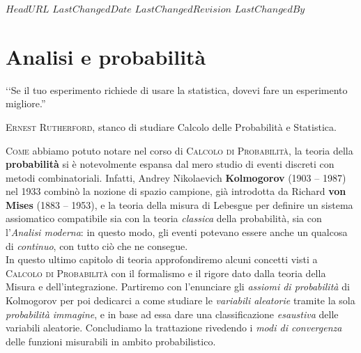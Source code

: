 \svnidlong
{$HeadURL$}
{$LastChangedDate$}
{$LastChangedRevision$}
{$LastChangedBy$}

\chapter{Analisi e probabilità}

\begin{introduction}
	‘‘Se il tuo esperimento richiede di usare la statistica, dovevi fare un esperimento migliore.''
	\begin{flushright}
		\textsc{Ernest Rutherford,} stanco di studiare Calcolo delle Probabilità e Statistica.
	\end{flushright}
\end{introduction}
\lettrine[findent=1pt, nindent=0pt]{C}{ome} abbiamo potuto notare nel corso di \textsc{Calcolo di Probabilità}, la teoria della \textbf{probabilità} si è notevolmente espansa dal mero studio di eventi discreti con metodi combinatoriali. Infatti, Andrey Nikolaevich \textbf{Kolmogorov} (1903 – 1987) nel 1933 combinò la nozione di spazio campione, già introdotta da Richard \textbf{von Mises} (1883 – 1953), e la teoria della misura di Lebesgue per definire un sistema assiomatico compatibile sia con la teoria \textit{classica} della probabilità, sia con l'\textit{Analisi moderna}: in questo modo, gli eventi potevano essere anche un qualcosa di \textit{continuo}, con tutto ciò che ne consegue.\\
In questo ultimo capitolo di teoria approfondiremo alcuni concetti visti a \textsc{Calcolo di Probabilità} con il formalismo e il rigore dato dalla teoria della Misura e dell'integrazione. Partiremo con l'enunciare gli \textit{assiomi di probabilità} di Kolmogorov per poi dedicarci a come studiare le \textit{variabili aleatorie} tramite la sola \textit{probabilità immagine}, e in base ad essa dare una classificazione \textit{esaustiva} delle variabili aleatorie. Concludiamo la trattazione rivedendo i \textit{modi di convergenza} delle funzioni misurabili in ambito probabilistico.

